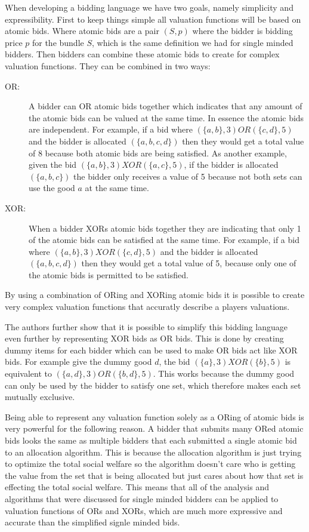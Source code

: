 \documentclass[10pt,onecolumn,letterpaper]{article}
\theoremstyle{definition}
\begin{document}
When developing a bidding language we have two goals, namely simplicity and expressibility. First to keep things simple all valuation functions will be based on atomic bids. Where atomic bids are a pair $(S,p)$ where the bidder is bidding price $p$ for the bundle $S$, which is the same definition we had for single minded bidders. Then bidders can combine these atomic bids to create for complex valuation functions. They can be combined in two ways:

\begin{description}
  \item [OR:] A bidder can OR atomic bids together which indicates that any amount of the atomic bids can be valued at the same time. In essence the atomic bids are independent. For example, if a bid where $(\{a,b\}, 3) OR (\{c,d\}, 5)$ and the bidder is allocated $(\{a,b,c,d\})$ then they would get a total value of 8 because both atomic bids are being satisfied. As another example, given the bid $(\{a,b\}, 3) XOR (\{a,c\}, 5)$, if the bidder is allocated $(\{a,b,c\})$ the bidder only receives a value of 5 because not both sets can use the good $a$ at the same time. 

  \item [XOR:] When a bidder XORs atomic bids together they are indicating that only 1 of the atomic bids can be satisfied at the same time. For example, if a bid where $(\{a,b\}, 3) XOR (\{c,d\}, 5)$ and the bidder is allocated $(\{a,b,c,d\})$ then they would get a total value of 5, because only one of the atomic bids is permitted to be satisfied. 

\end{description}

By using a combination of ORing and XORing atomic bids it is possible to create very complex valuation functions that accuratly describe a players valuations.

The authors further show that it is possible to simplify this bidding language even further by representing XOR bids as OR bids. This is done by creating dummy items for each bidder which can be used to make OR bids act like XOR bids. For example give the dummy good $d$, the bid $(\{a\}, 3) XOR (\{b\}, 5)$ is equivalent to $(\{a,d\}, 3) OR (\{b,d\}, 5)$. This works because the dummy good can only be used by the bidder to satisfy one set, which therefore makes each set mutually exclusive. 

Being able to represent any valuation function solely as a ORing of atomic bids is very powerful for the following reason. A bidder that submits many ORed atomic bids looks the same as multiple bidders that each submitted a single atomic bid to an allocation algorithm. This is because the allocation algorithm is just trying to optimize the total social welfare so the algorithm doesn't care who is getting the value from the set that is being allocated but just cares about how that set is effecting the total social welfare. This means that all of the analysis and algorithms that were discussed for single minded bidders can be applied to valuation functions of ORs and XORs, which are much more expressive and accurate than the simplified signle minded bids. 
\end{document}
